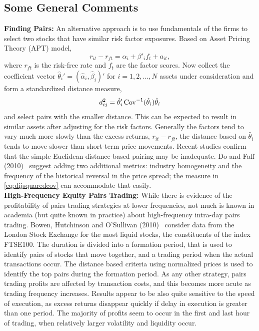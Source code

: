 \subsection{Some General Comments}


\noindent\textbf{Finding Pairs:} An alternative approach is to use fundamentals of the firms to select two stocks that have similar risk factor exposures. Based on Asset Pricing Theory (APT) model,
	\begin{equation}
	r_{it} - r_{ft} = \alpha_i + \beta'_if_t + a_{it},
	\end{equation}
where $r_{ft}$ is the risk-free rate and $f_t$ are the factor scores. Now collect the coefficient vector $\hat{\theta}_i' = (\hat{\alpha}_i, \hat{\beta}_i)'$ for $i = 1, 2, \ldots, N$ assets under consideration and form a standardized distance measure,
	\begin{equation} \label{eq:dijsquaredcov}
	d_{ij}^2 = \hat{\theta}_i' \Cov^{-1}(\hat{\theta}_i)\hat{\theta}_i
	\end{equation}
and select pairs with the smaller distance. This can be expected to result in similar assets after adjusting for the risk factors. Generally the factors tend to vary much more slowly than the excess returns, $r_{it} - r_{ft}$, the distance based on $\hat{\theta}_i$ tends to move slower than short-term price movements. Recent studies confirm that the simple Euclidean distance-based pairing may be inadequate. Do and Faff (2010)~\cite{do2010does} suggest adding two additional metrics: industry homogeneity and the frequency of the historical reversal in the price spread; the measure in \eqref{eq:dijsquaredcov} can accommodate that easily. \\


\noindent\textbf{High-Frequency Equity Pairs Trading:} While there is evidence of the profitability of pairs trading strategies at lower frequencies, not much is known in academia (but quite known in practice) about high-frequency intra-day pairs trading. Bowen, Hutchinson and O'Sullivan (2010)~\cite{bho} consider data from the London Stock Exchange for the most liquid stocks, the constituents of the index FTSE100. The duration is divided into a formation period, that is used to identify pairs of stocks that move together, and a trading period when the actual transactions occur. The distance based criteria using normalized prices is used to identify the top pairs during the formation period. As any other strategy, pairs trading profits are affected by transaction costs, and this becomes more acute as trading frequency increases. Results appear to be also quite sensitive to the speed of execution, as excess returns disappear quickly if delay in execution is greater than one period. The majority of profits seem to occur in the first and last hour of trading, when relatively larger volatility and liquidity occur.


